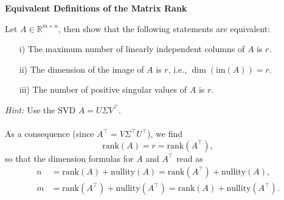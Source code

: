 \textbf{\normalsize Equivalent Definitions of the Matrix Rank}

Let $A \in \mathbb{R}^{m \times n}$, then show that the following statements are equivalent:
\begin{itemize}
	\item[i)] The maximum number of linearly independent columns of $A$ is $r$.
	\item[ii)] The dimension of the image of $A$ is $r$, i.e., $\dim(\text{im}(A)) = r$.
	\item[iii)] The number of positive singular values of $A$ is $r$.
\end{itemize}
\textit{Hint:} Use the SVD $A=U\Sigma V^\top$.\\~\\
{\color{navy}As a consequence (since $A^\top = V\Sigma^\top U^\top$), we find 
$$\text{rank}(A) = r=\text{rank}(A^\top),  $$
so that the dimension formulas for $A$ and $A^\top$ read as
\begin{align*}
n &= \text{rank}(A) + \text{nullity}(A)= \text{rank}(A^\top) + \text{nullity}(A),\\
m &= \text{rank}(A^\top) + \text{nullity}(A^\top)=\text{rank}(A) + \text{nullity}(A^\top).\\
\end{align*}
}